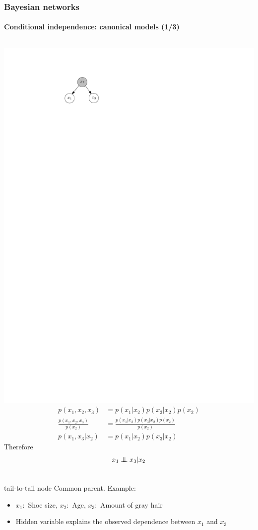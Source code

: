 \documentclass[slidestop,compress,mathserif]{beamer}
\newcommand{\bi}{\begin{itemize}}
\newcommand{\ei}{\end{itemize}}
\newcommand{\indep}{\ensuremath{\perp\mkern -10mu \perp}}
\begin{document}
\begin{frame}
	\frametitle{Bayesian networks}
	\framesubtitle{Conditional independence: canonical models (1/3)}
  \begin{columns}
    \includegraphics[width=.7\textwidth]{headtohead4}%
   \begin{align*}
   p(x_1,x_2,x_3) & = p(x_1|x_2)p(x_3|x_2)p(x_2)\\
   \frac{p(x_1,x_2,x_3)}{p(x_2)} & = \frac{p(x_1|x_2)p(x_3|x_2)p(x_2)}{p(x_2)}\\
   p(x_1,x_3|x_2) & = p(x_1|x_2)p(x_3|x_2)
   \end{align*}
   Therefore
   \begin{align*}
    x_1\indep x_3 | x_2
   \end{align*}
   \end{columns} 
    \begin{block}{tail-to-tail node}
    Common parent. Example:
    \bi
    \item
     $x_1: $ Shoe size, $x_2 :$ Age, $x_3 :$ Amount of gray hair
    \item  
    Hidden variable explains the observed dependence between $x_1$ and $x_3$
    \ei
    \end{block}

\end{frame}
\end{document}
